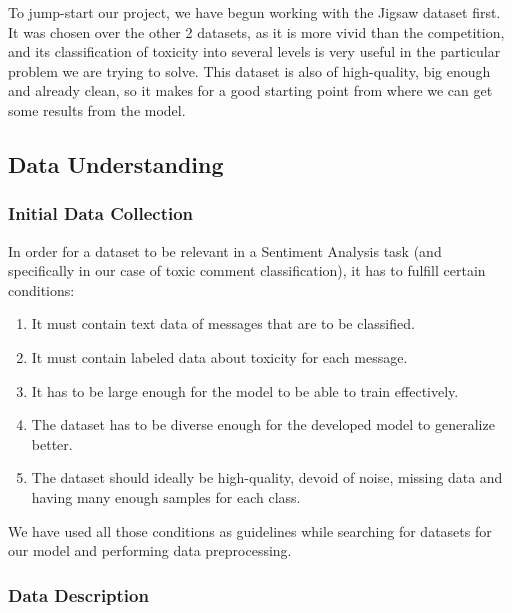 \documentclass[]{article}
\begin{document}
	To jump-start our project, we have begun working with the Jigsaw dataset first. It was chosen over the other 2 datasets, as it is more vivid than the competition, and its classification of toxicity into several levels is very useful in the particular problem we are trying to solve. This dataset is also of high-quality, big enough and already clean, so it makes for a good starting point from where we can get some results from the model.
	
	\subsection{Data Understanding}
	
	\subsubsection{Initial Data Collection}
	
	In order for a dataset to be relevant in a Sentiment Analysis task (and specifically in our case of toxic comment classification), it has to fulfill certain conditions:
	\begin{enumerate}
		\item It must contain text data of messages that are to be classified.
		\item It must contain labeled data about toxicity for each message.
		\item It has to be large enough for the model to be able to train effectively.
		\item The dataset has to be diverse enough for the developed model to generalize better.
		\item The dataset should ideally be high-quality, devoid of noise, missing data and having many enough samples for each class.
	\end{enumerate}
	We have used all those conditions as guidelines while searching for datasets for our model and performing data preprocessing.
	
	\subsubsection{Data Description}
	
\end{document}
